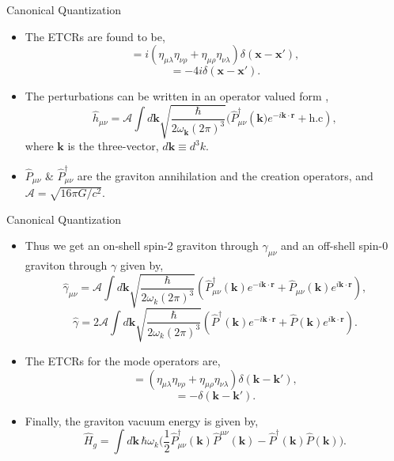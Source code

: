 \documentclass[12pt,aspectratio=1610]{beamer}
\newcommand{\munu}{\mu\nu}
\begin{document}
\begin{frame}{Canonical Quantization}
    \begin{itemize}
        \item The ETCRs are found to be,
        \begin{equation*}
            [\gamma_{\munu}(x), \pi_{\lambda\rho}(x')] = i(\eta_{\mu\lambda}\eta_{\nu\rho} + \eta_{\mu\rho}\eta_{\nu\lambda})\delta(\bm{x}-\bm{x'}),
        \end{equation*}
        \begin{equation*}
            [\gamma(x), \pi(x')] = -4i\delta(\bm{x}-\bm{x'}).
        \end{equation*}
        \item The perturbations can be written in an operator valued form \citep{Bose_2022}, $$\hat{h}_{\mu\nu}=\mathcal{A}\int d\bm{k}\sqrt{\frac{\hbar}{2\omega_{\bm{k}}(2\pi)^{3}}}(\hat{P}_{\mu\nu}^{\dagger}(\bm{k)}e^{-i\bm{k}\cdot\bm{r}}+\text{h.c}),$$
        where ${\bm{k}}$ is the three-vector, $d{\bm{k}}\equiv d^{3}k$. 
        \item $\hat{P}_{\mu\nu}$ \& $\hat{P}_{\mu\nu}^{\dagger}$ are the graviton annihilation and the creation operators, and $\mathcal{A}=\sqrt{16\pi G/c^{2}}$.
    \end{itemize}
\end{frame}
\begin{frame}{Canonical Quantization}
    \begin{itemize}
        \item Thus we get an on-shell spin-2 graviton through $\gamma_{\munu}$ and an off-shell spin-0 graviton through $\gamma$ given by,
        \begin{equation*}
    \hat{\gamma}_{\munu} = \mathcal{A}\int d\bm{k} \sqrt{\frac{\hbar}{2\omega_k(2\pi)^3}}(\hat{P}_{\munu}^{\dagger}(\bm{k})e^{-i\bm{k}\cdot\bm{r}} + \hat{P}_{\munu}(\bm{k})e^{i\bm{k}\cdot\bm{r}}),
\end{equation*}
\begin{equation*}
    \hat{\gamma} = 2\mathcal{A}\int d\bm{k} \sqrt{\frac{\hbar}{2\omega_k(2\pi)^3}}(\hat{P}^{\dagger}(\bm{k})e^{-i\bm{k}\cdot\bm{r}} + \hat{P}(\bm{k})e^{i\bm{k}\cdot\bm{r}}).
\end{equation*}
\item The ETCRs for the mode operators are,
\begin{equation*}
    [\hat{P}_{\munu}(\bm{k}), \hat{P}_{\lambda\rho}^{\dagger}(\bm{k'})] = (\eta_{\mu\lambda}\eta_{\nu\rho} + \eta_{\mu\rho}\eta_{\nu\lambda})\delta(\bm{k} - \bm{k'}),
\end{equation*}
\begin{equation*}
    [\hat{P}(\bm{k}), \hat{P}^{\dagger}(\bm{k'})] = -\delta(\bm{k} - \bm{k'}).
\end{equation*}
\item Finally, the graviton vacuum energy is given by,
\begin{equation*}
    \hat{H}_g = \int d\bm{k}\,\hbar\omega_k\bigg(\frac{1}{2}\hat{P}_{\munu}^{\dagger}(\bm{k})\hat{P}^{\munu}(\bm{k}) - \hat{P}^{\dagger}(\bm{k})\hat{P}(\bm{k})\bigg).
\end{equation*}
    \end{itemize}
\end{frame}
\end{document}

